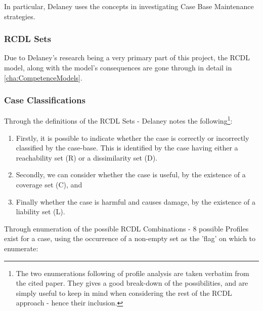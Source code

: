 \documentclass[a4paper,11pt]{report}
\begin{document}
In particular, Delaney uses the concepts in investigating Case Base Maintenance strategies.

\subsubsection{RCDL Sets}
Due to Delaney's research being a very primary part of this project, the RCDL model, along with the model's consequences are gone through in detail in \ref{cha:CompetenceModels}. 

\subsubsection{Case Classifications}
Through the definitions of the RCDL Sets - Delaney notes the following\cite{Delany2009}\footnote{The two enumerations following of profile analysis are taken verbatim from the cited paper. They gives a good break-down of the possibilities, and are simply useful to keep in mind when considering the rest of the RCDL approach - hence their inclusion.}:

\begin{enumerate}
	\item Firstly, it is possible to indicate whether the case is correctly or incorrectly classified by the case-base. This is identified by the case having either a reachability set (R) or a dissimilarity set (D).
	\item Secondly, we can consider whether the case is useful, by the existence of a coverage set (C), and
	\item Finally whether the case is harmful and causes damage, by the existence of a liability set (L).
\end{enumerate}

Through enumeration of the possible RCDL Combinations - 8 possible Profiles exist for a case, using the occurrence of a non-empty set as the 'flag' on which to enumerate\cite{Delany2009}:
\end{document}
